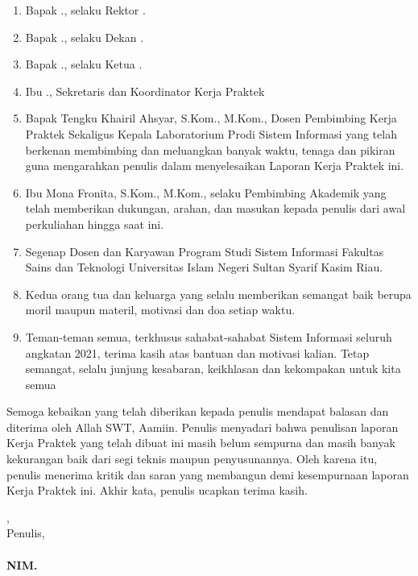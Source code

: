 \begin{enumerate}
	\item Bapak \rektor., selaku Rektor \universitas.
	\item Bapak \dekan., selaku Dekan \fakultas.
	\item Bapak \kaprodi., selaku Ketua \programStudi \space
	      \fakultas \space \universitas.
	\item Ibu \sekretarisprodi., Sekretaris dan Koordinator Kerja Praktek \programStudi \space
	      \fakultas \space \universitas
	\item Bapak Tengku Khairil Ahsyar, S.Kom., M.Kom., Dosen Pembimbing Kerja Praktek Sekaligus Kepala Laboratorium Prodi Sistem Informasi yang telah berkenan membimbing dan meluangkan banyak waktu, tenaga dan pikiran guna mengarahkan penulis dalam menyelesaikan Laporan Kerja Praktek ini.
	\item Ibu Mona Fronita, S.Kom., M.Kom., selaku Pembimbing Akademik yang telah memberikan dukungan, arahan, dan masukan kepada penulis dari awal perkuliahan hingga saat ini.
	\item Segenap Dosen dan Karyawan Program Studi Sistem Informasi Fakultas Sains dan Teknologi Universitas Islam Negeri Sultan Syarif Kasim Riau.
	\item Kedua orang tua dan keluarga yang selalu memberikan semangat baik berupa moril maupun materil, motivasi dan doa setiap waktu.
	\item Teman-teman semua, terkhusus sahabat-sahabat Sistem Informasi seluruh angkatan 2021, terima kasih atas bantuan dan motivasi kalian. Tetap semangat, selalu junjung kesabaran, keikhlasan dan kekompakan untuk kita semua

\end{enumerate}

Semoga kebaikan yang telah diberikan kepada penulis mendapat balasan dan diterima oleh Allah SWT, Aamiin. Penulis menyadari bahwa penulisan laporan Kerja Praktek yang telah dibuat ini masih belum sempurna dan masih banyak kekurangan baik dari segi teknis maupun penyusunannya. Oleh karena itu, penulis menerima kritik dan saran yang membangun demi kesempurnaan laporan Kerja Praktek ini. Akhir kata, penulis ucapkan terima kasih.

\vspace*{0.1cm}

\begin{flushright}
	\kota, \tanggalPersetujuan\\
	Penulis,\\
	\vspace{2cm}
	\textbf{\underline{\penulis}\\
		NIM. \nim}

\end{flushright}

